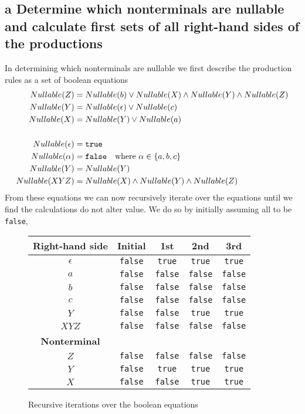 \documentclass[11pt,a4paper]{article}
\begin{document}
\subsection*{a \mdseries Determine which nonterminals are nullable and
calculate first sets of all right-hand sides of the productions}
In determining which nonterminals are nullable we first describe the
production rules as a set of boolean equations
\begin{align*}
	Nullable(Z) &= Nullable(b) \lor Nullable(X) \land Nullable(Y) \land Nullable(Z) \\
	Nullable(Y) &= Nullable(\epsilon) \lor Nullable(c) \\
	Nullable(X) &= Nullable(Y) \lor Nullable(a) \\\\
	Nullable(\epsilon) &= {\tt true} \\
	Nullable(\alpha) &= {\tt false} \quad \text{where $\alpha \in \{a, b, c\}$}\\
	Nullable(Y) &= Nullable(Y) \\
	Nullable(XYZ) &= Nullable(X) \land Nullable(Y) \land Nullable(Z)
\end{align*}
From these equations we can now recursively iterate over the equations until
we find the calculations do not alter value. We do so by initially assuming
all to be {\tt false},
\begin{figure}[H]
	\center
	\begin{tabular}{c|cccc}
		{\bf Right-hand side} & {\bf Initial} & {\bf 1st} & {\bf 2nd} & {\bf 3rd} \\ \hline
		$\epsilon$ 	& {\tt false} & {\tt true} & {\tt true} & {\tt true} \\
		$a$ 		& {\tt false} & {\tt false} & {\tt false} & {\tt false} \\
		$b$ 		& {\tt false} & {\tt false} & {\tt false} & {\tt false} \\
		$c$ 		& {\tt false} & {\tt false} & {\tt false} & {\tt false} \\
		$Y$ 		& {\tt false} & {\tt false} & {\tt true} & {\tt true} \\
		$XYZ$ 		& {\tt false} & {\tt false} & {\tt false} & {\tt false} \\ \hline
		{\bf Nonterminal} & {\ } & {\ } \\ \hline
		$Z$ 		& {\tt false} & {\tt false} & {\tt false} & {\tt false} \\
		$Y$ 		& {\tt false} & {\tt true} & {\tt true} & {\tt true} \\
		$X$ 		& {\tt false} & {\tt false} & {\tt true} & {\tt true} \\
	\end{tabular}
	\label{table:nullable}
	\caption{Recursive iterations over the boolean equations}
\end{figure}
\end{document}
